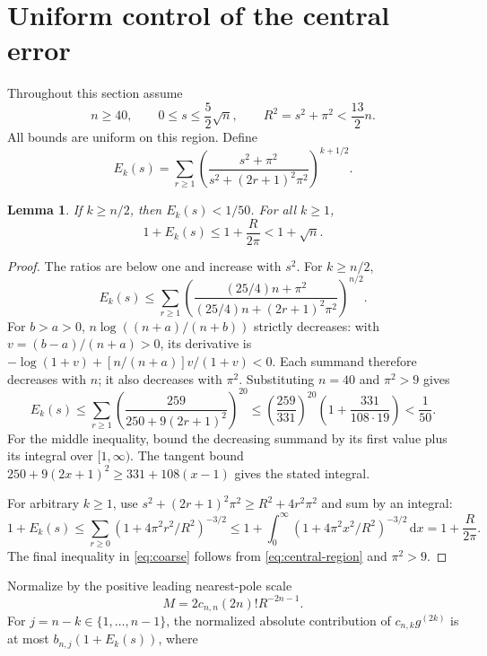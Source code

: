 \documentclass[11pt,letterpaper]{article}
\numberwithin{equation}{section}
\newtheorem{lemma}[theorem]{Lemma}
\newcommand{\dd}{\,\mathrm d}
\begin{document}
\section{Uniform control of the central error}\label{sec:error}
Throughout this section assume
\begin{equation}\label{eq:central-region}
 n\ge40,\qquad 0\le s\le\frac52\sqrt n,\qquad R^2=s^2+\pi^2<\frac{13}2n.
\end{equation}
All bounds are uniform on this region. Define
\[
 E_k(s)=\sum_{r\ge1}
 \left(\frac{s^2+\pi^2}{s^2+(2r+1)^2\pi^2}\right)^{k+1/2}.
\]
\begin{lemma}\label{lem:tails}
If $k\ge n/2$, then $E_k(s)<1/50$. For all $k\ge1$,
\begin{equation}\label{eq:coarse}1+E_k(s)\le1+\frac R{2\pi}<1+\sqrt n.\end{equation}
\end{lemma}
\begin{proof}
The ratios are below one and increase with $s^2$. For $k\ge n/2$,
\[
 E_k(s)\le\sum_{r\ge1}
 \left(\frac{(25/4)n+\pi^2}{(25/4)n+(2r+1)^2\pi^2}\right)^{n/2}.
\]
For $b>a>0$, $n\log((n+a)/(n+b))$ strictly decreases: with $v=(b-a)/(n+a)>0$, its derivative is
$-\log(1+v)+[n/(n+a)]v/(1+v)<0$. Each summand therefore decreases with $n$; it also decreases with $\pi^2$. Substituting $n=40$ and $\pi^2>9$ gives
\begin{equation}\label{eq:pole-rational}
 E_k(s)\le\sum_{r\ge1}\left(\frac{259}{250+9(2r+1)^2}\right)^{20}
 \le\left(\frac{259}{331}\right)^{20}
 \left(1+\frac{331}{108\cdot19}\right)<\frac1{50}.
\end{equation}
For the middle inequality, bound the decreasing summand by its first value plus its integral over $[1,\infty)$. The tangent bound
$250+9(2x+1)^2\ge331+108(x-1)$ gives the stated integral.

For arbitrary $k\ge1$, use $s^2+(2r+1)^2\pi^2\ge R^2+4r^2\pi^2$ and sum by an integral:
\[
 1+E_k(s)\le\sum_{r\ge0}(1+4\pi^2r^2/R^2)^{-3/2}
 \le1+\int_0^\infty(1+4\pi^2x^2/R^2)^{-3/2}\dd x
 =1+\frac R{2\pi}.
\]
The final inequality in \eqref{eq:coarse} follows from \eqref{eq:central-region} and $\pi^2>9$.
\end{proof}
Normalize by the positive leading nearest-pole scale
\begin{equation}\label{eq:M}M=2c_{n,n}(2n)!R^{-2n-1}.\end{equation}
For $j=n-k\in\{1,\ldots,n-1\}$, the normalized absolute contribution of $c_{n,k}g^{(2k)}$ is at most $b_{n,j}(1+E_k(s))$, where
\end{document}
